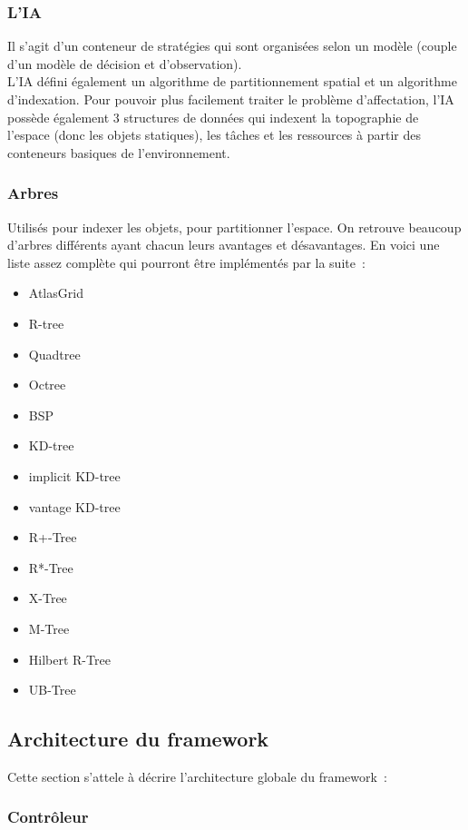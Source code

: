 \subsubsection*{L'IA}

Il s'agit d'un conteneur de stratégies qui sont organisées selon un modèle (couple d'un modèle de décision et d'observation).\\
\indent L'IA défini également un algorithme de partitionnement spatial et un algorithme d'indexation.
Pour pouvoir plus facilement traiter le problème d'affectation, l'IA possède également 3 structures de données qui indexent la topographie de l'espace (donc les objets statiques), les tâches et les ressources à partir des conteneurs basiques de l'environnement.

\subsubsection*{Arbres}

Utilisés pour indexer les objets, pour partitionner l'espace. On retrouve beaucoup d'arbres différents ayant chacun leurs avantages et désavantages. En voici une liste assez complète qui pourront être implémentés par la suite~:
\begin{itemize}
\item AtlasGrid
\item R-tree
\item Quadtree
\item Octree
\item BSP
\item KD-tree
\item implicit KD-tree
\item vantage KD-tree
\item R+-Tree
\item R*-Tree
\item X-Tree
\item M-Tree
\item Hilbert R-Tree
\item UB-Tree
\end{itemize}

\subsection{Architecture du framework}

Cette section s'attele à décrire l'architecture globale du framework~:

\subsubsection*{Contrôleur}

